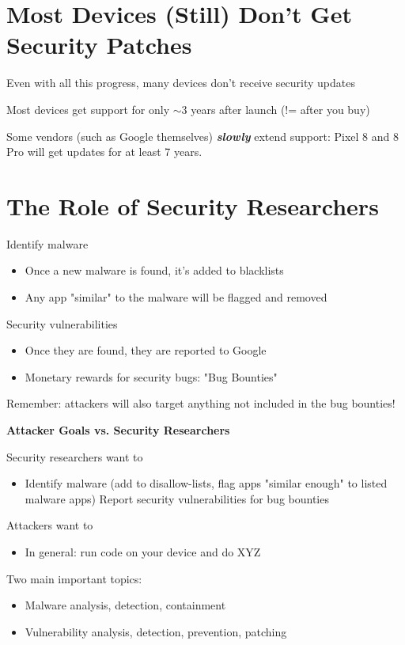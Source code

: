 \documentclass[11pt]{article}
\begin{document}
\section*{Most Devices (Still) Don't Get Security Patches}

Even with all this progress, many devices don't receive security updates

Most devices get support for only $\sim$3 years after launch (!= after you buy)

Some vendors (such as Google themselves) \textit{\textbf{slowly}} extend support: Pixel 8 and 8 Pro will get updates for at least 7 years. 

\section*{The Role of Security Researchers}

Identify malware
\begin{itemize}
	\item Once a new malware is found, it's added to blacklists
	\item Any app "similar" to the malware will be flagged and removed
\end{itemize}

Security vulnerabilities
\begin{itemize}
	\item Once they are found, they are reported to Google
	\item Monetary rewards for security bugs: "Bug Bounties"
\end{itemize}

Remember: attackers will also target anything not included in the bug bounties!

\textbf{Attacker Goals vs. Security Researchers}

Security researchers want to
\begin{itemize}
	\item Identify malware (add to disallow-lists, flag apps "similar enough" to listed malware apps) 
	\itme Report security vulnerabilities for bug bounties
\end{itemize}

Attackers want to
\begin{itemize}
	\item In general: run code on your device and do XYZ
\end{itemize}

Two main important topics:
\begin{itemize}
	\item Malware analysis, detection, containment
	\item Vulnerability analysis, detection, prevention, patching
\end{itemize}
\end{document}
